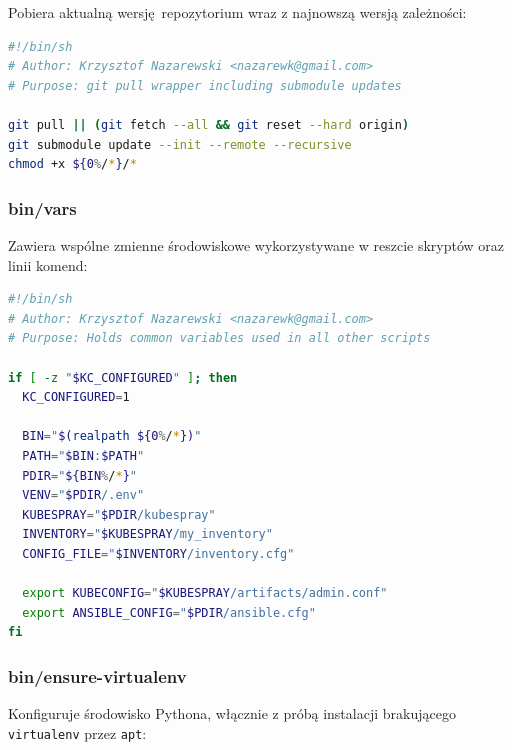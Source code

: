 \documentclass[a4paper,12pt,twoside,openany]{report}
\newcommand{\passthrough}[1]{#1}
\begin{document}
Pobiera aktualną wersję~repozytorium wraz z najnowszą wersją zależności:

\begin{lstlisting}[language=bash]
#!/bin/sh
# Author: Krzysztof Nazarewski <nazarewk@gmail.com>
# Purpose: git pull wrapper including submodule updates

git pull || (git fetch --all && git reset --hard origin)
git submodule update --init --remote --recursive
chmod +x ${0%/*}/*
\end{lstlisting}

\hypertarget{binvars}{%
\subsubsection{bin/vars}\label{binvars}}

Zawiera wspólne zmienne środowiskowe wykorzystywane w reszcie skryptów
oraz linii komend:

\begin{lstlisting}[language=bash]
#!/bin/sh
# Author: Krzysztof Nazarewski <nazarewk@gmail.com>
# Purpose: Holds common variables used in all other scripts

if [ -z "$KC_CONFIGURED" ]; then
  KC_CONFIGURED=1

  BIN="$(realpath ${0%/*})"
  PATH="$BIN:$PATH"
  PDIR="${BIN%/*}"
  VENV="$PDIR/.env"
  KUBESPRAY="$PDIR/kubespray"
  INVENTORY="$KUBESPRAY/my_inventory"
  CONFIG_FILE="$INVENTORY/inventory.cfg"

  export KUBECONFIG="$KUBESPRAY/artifacts/admin.conf"
  export ANSIBLE_CONFIG="$PDIR/ansible.cfg"
fi
\end{lstlisting}

\hypertarget{binensure-virtualenv}{%
\subsubsection{bin/ensure-virtualenv}\label{binensure-virtualenv}}

Konfiguruje środowisko Pythona, włącznie z próbą instalacji brakującego
\passthrough{\lstinline!virtualenv!} przez
\passthrough{\lstinline!apt!}:
\end{document}
